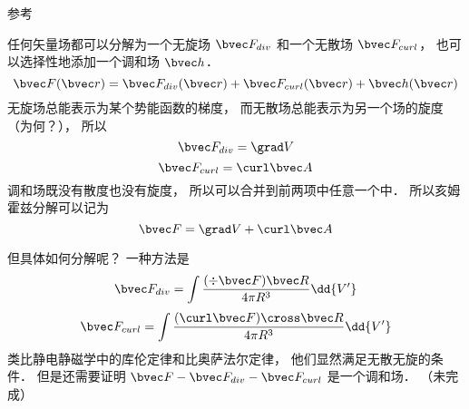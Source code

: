 
\begin{issues}
\issueDraft
\end{issues}

参考 \cite{GriffE}

任何矢量场都可以分解为一个无旋场 $\bvec F_{div}$ 和一个无散场 $\bvec F_{curl}$， 也可以选择性地添加一个调和场 $\bvec h$．
\begin{equation}
\bvec F(\bvec r) = \bvec F_{div}(\bvec r) + \bvec F_{curl}(\bvec r) + \bvec h(\bvec r)
\end{equation}
无旋场总能表示为某个势能函数的梯度， 而无散场总能表示为另一个场的旋度（为何？）， 所以
\begin{equation}
\bvec F_{div} = \grad V
\end{equation}
\begin{equation}
\bvec F_{curl} = \curl \bvec A
\end{equation}
调和场既没有散度也没有旋度， 所以可以合并到前两项中任意一个中． 所以亥姆霍兹分解可以记为
\begin{equation}
\bvec F = \grad V + \curl \bvec A
\end{equation}

但具体如何分解呢？ 一种方法是
\begin{equation}
\bvec F_{div} = \int \frac{(\div \bvec F)\bvec R}{4\pi R^3} \dd{V'}
\end{equation}
\begin{equation}
\bvec F_{curl} = \int \frac{(\curl \bvec F)\cross \bvec R}{4\pi R^3} \dd{V'}
\end{equation}
类比静电静磁学中的库伦定律和比奥萨法尔定律， 他们显然满足无散无旋的条件． 但是还需要证明 $\bvec F - \bvec F_{div} - \bvec F_{curl}$ 是一个调和场．
（未完成）
